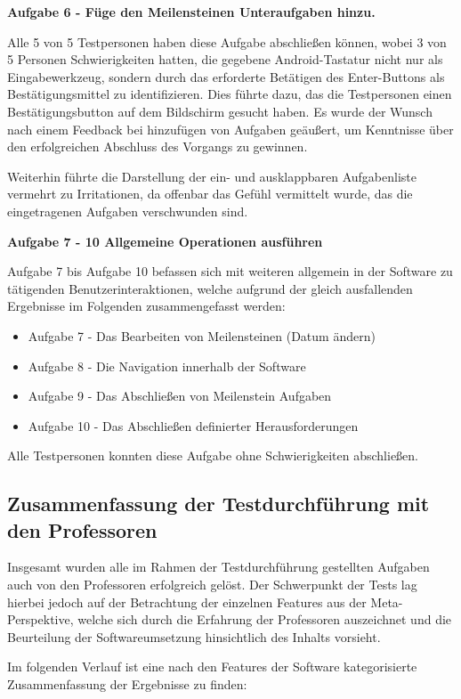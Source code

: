 \documentclass[bibliography=totoc,listof=totoc,BCOR=5mm,DIV=12,oneside]{scrbook}
\begin{document}
\newpage
\par \bigskip \textbf{Aufgabe 6 - Füge den Meilensteinen Unteraufgaben hinzu.}
\par Alle 5 von 5 Testpersonen haben diese Aufgabe abschließen können, wobei 3 von 5 Personen Schwierigkeiten hatten, die gegebene Android-Tastatur nicht nur als Eingabewerkzeug, sondern durch das erforderte Betätigen des Enter-Buttons als Bestätigungsmittel zu identifizieren. Dies führte dazu, das die Testpersonen einen Bestätigungsbutton auf dem Bildschirm gesucht haben. Es wurde der Wunsch nach einem Feedback bei hinzufügen von Aufgaben geäußert, um Kenntnisse über den erfolgreichen Abschluss des Vorgangs zu gewinnen.
\par Weiterhin führte die Darstellung der ein- und ausklappbaren Aufgabenliste vermehrt zu Irritationen, da offenbar das Gefühl vermittelt wurde, das die eingetragenen Aufgaben verschwunden sind.

\par \bigskip \textbf{Aufgabe 7 - 10 Allgemeine Operationen ausführen}
\par Aufgabe 7 bis Aufgabe 10 befassen sich mit weiteren allgemein in der Software zu tätigenden Benutzerinteraktionen, welche aufgrund der gleich ausfallenden Ergebnisse im Folgenden zusammengefasst werden:
\begin{itemize}
\item Aufgabe 7  - Das Bearbeiten von Meilensteinen (Datum ändern)
\item Aufgabe 8  - Die Navigation innerhalb der Software
\item Aufgabe 9  - Das Abschließen von Meilenstein Aufgaben
\item Aufgabe 10 - Das Abschließen definierter Herausforderungen
\end{itemize}
\par Alle Testpersonen konnten diese Aufgabe ohne Schwierigkeiten abschließen.

\newpage
\subsection{Zusammenfassung der Testdurchführung mit den Professoren}
\par Insgesamt wurden alle im Rahmen der Testdurchführung gestellten Aufgaben auch von den Professoren erfolgreich gelöst. Der Schwerpunkt der Tests lag hierbei jedoch auf der Betrachtung der einzelnen Features aus der Meta-Perspektive, welche sich durch die Erfahrung der Professoren auszeichnet und die Beurteilung der Softwareumsetzung hinsichtlich des Inhalts vorsieht.
\par \bigskip Im folgenden Verlauf ist eine nach den Features der Software kategorisierte Zusammenfassung der Ergebnisse zu finden:
\end{document}
